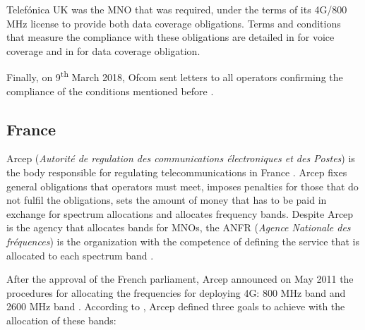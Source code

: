 
Telefónica UK was the MNO that was required, under the terms of its 4G/800 MHz license to provide both data coverage obligations. Terms and conditions that measure the compliance with these obligations are detailed in \cite{2-15} for voice coverage and in \cite{2-16} for data coverage obligation.\par

Finally, on 9\textsuperscript{th} March 2018, Ofcom sent letters to all operators confirming the compliance of the conditions mentioned before \cite{2-17}.\par

\subsection*{France}
Arcep (\textit{Autorité de regulation des communications électroniques et des Postes}) is the body responsible for regulating telecommunications in France \cite{2-18}. Arcep fixes general obligations that operators must meet, imposes penalties for those that do not fulfil the obligations, sets the amount of money that has to be paid in exchange for spectrum allocations and allocates frequency bands. Despite Arcep is the agency that allocates bands for MNOs, the ANFR (\textit{Agence Nationale des fréquences}) is the organization with the competence of defining the service that is allocated to each spectrum band \cite{2-19}.\par

After the approval of the French parliament, Arcep announced on May 2011 the procedures for allocating the frequencies for deploying 4G: 800 MHz band \cite{2-20} and 2600 MHz band \cite{2-21}. According to \cite{2-22}, Arcep defined three goals to achieve with the allocation of these bands:\par

